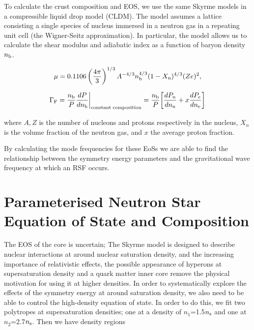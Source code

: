 \documentclass[fleqn,usenatbib]{mnras}
\begin{document}
To calculate the crust composition and EOS, we use the same Skyrme models in a compressible liquid drop model (CLDM). The model assumes a lattice consisting a single species of nucleus immersed in a neutron gas in a repeating unit cell (the Wigner-Seitz approximation). In particular, the model allows us to calculate the shear modulus and adiabatic index as a function of baryon density $n_{\rm b}$. 

\begin{equation} \label{eq:shear_mod}
	\mu = 0.1106 \left(\frac{4\pi}{3}\right)^{1/3} A^{-4/3} n_{\rm b}^{4/3} (1-X_{\rm n})^{4/3} (Ze)^2,
\end{equation}

\begin{equation}
\Gamma_{\rm F} = \frac{n_{\rm b}}{P} \frac{dP}{dn_{\rm b}}\bigg|_{\rm constant \; composition} =  \frac{n_{\rm b}}{P} \bigg[\frac{dP_n}{dn_{\rm n}} +  x \frac{dP_e}{dn_{\rm e}}  \bigg]
\end{equation}

\noindent where $A,Z$ is the number of nucleons and protons  respectively in the nucleus, $X_n$ is the volume fraction of the neutron gas, and $x$ the average proton fraction.

By calculating the mode frequencies for these EoSs we are able to find the relationship between the symmetry energy parameters and the gravitational wave frequency at which an RSF occurs.







\section{Parameterised Neutron Star Equation of State and Composition}


The EOS of the core is uncertain; The Skyrme model is designed to describe nuclear interactions at around nuclear saturation density, and the increasing importance of relativistic effects,  the possible appearance of hyperons at supersaturation density and a quark matter inner core remove the physical motivation for using it at higher densities. In order to systematically explore the effects of the symmetry energy at around saturation density, we also need to be able to control the high-density equation of state. In order to do this, we fit two polytropes at supersaturation densities; one at a density of $n_1$=1.5$n_{\rm s}$ and one at $n_2$=2.7$n_{\rm s}$. Then we have density regions
\end{document}
